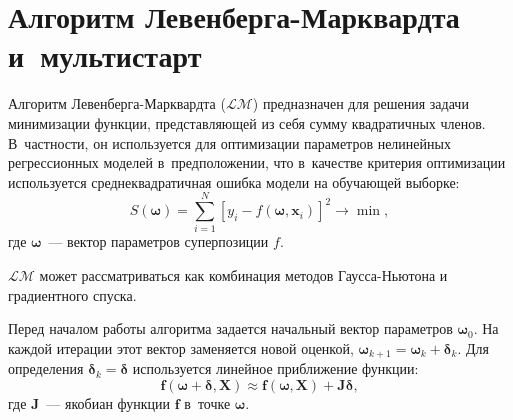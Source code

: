 \documentclass[12pt,a4paper]{article}
\begin{document}

\section{Алгоритм Левенберга-Марквардта и~мультистарт}

Алгоритм Левенберга-Марквардта ($\mathcal{LM}$) \cite{Marquardt1963Algorithm, more:78}
предназначен для решения задачи минимизации функции, представляющей из себя
сумму квадратичных членов. В~частности, он используется для оптимизации
параметров нелинейных регрессионных моделей в~предположении, что в~качестве
критерия оптимизации используется среднеквадратичная ошибка модели на
обучающей выборке:
\[
S(\boldsymbol{\omega}) = \sum_{i=1}^{N} [y_i - f(\boldsymbol{\omega}, \mathbf{x}_i)]^2 \to \min,
\]
где $\boldsymbol{\omega}$~--- вектор параметров суперпозиции $f$.

$\mathcal{LM}$ может рассматриваться как комбинация методов Гаусса-Ньютона и
градиентного спуска.

Перед началом работы алгоритма задается начальный вектор параметров $\boldsymbol{\omega}_0$.
На каждой итерации этот вектор заменяется новой оценкой,
$\boldsymbol{\omega}_{k+1} = \boldsymbol{\omega}_k + \boldsymbol{\delta}_k$.
Для определения $\boldsymbol{\delta}_k = \boldsymbol{\delta}$ используется линейное приближение функции:
\[
\mathbf{f(\boldsymbol{\omega} + \boldsymbol{\delta}, X)} \approx
	\mathbf{f(\boldsymbol{\omega}, X)} + \mathbf{J} \boldsymbol{\delta},
\]
где $\mathbf{J}$~--- якобиан функции $\mathbf{f}$ в~точке $\boldsymbol{\omega}$.
\end{document}

